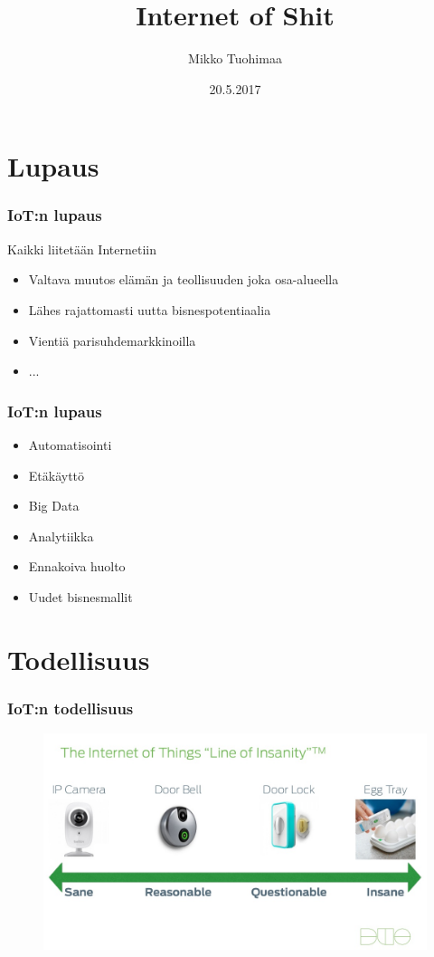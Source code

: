 \documentclass{beamer}
\title[Internet of Shit]{Internet of Shit} %
\author{Mikko Tuohimaa} %
\date{20.5.2017} %
\begin{document}
\begin{frame}
\titlepage %
\end{frame}

\section{Lupaus}

\begin{frame}
\frametitle{IoT:n lupaus} %
\begin{block}{}
Kaikki liitetään Internetiin
\end{block}
\begin{itemize}
	\item Valtava muutos elämän ja teollisuuden joka osa-alueella
	\item Lähes rajattomasti uutta bisnespotentiaalia
	\item Vientiä parisuhdemarkkinoilla
	\item ...
\end{itemize}
\end{frame}

\begin{frame}
\frametitle{IoT:n lupaus}
\begin{itemize}
\item Automatisointi
\item Etäkäyttö
\item Big Data
\item Analytiikka
\item Ennakoiva huolto
\item Uudet bisnesmallit
\end{itemize}
\end{frame}

\section{Todellisuus}

\begin{frame}
\frametitle{IoT:n todellisuus}
\begin{figure}
\includegraphics[width=\linewidth]{line-of-insanity}
\end{figure}
\end{frame}
\end{document}
